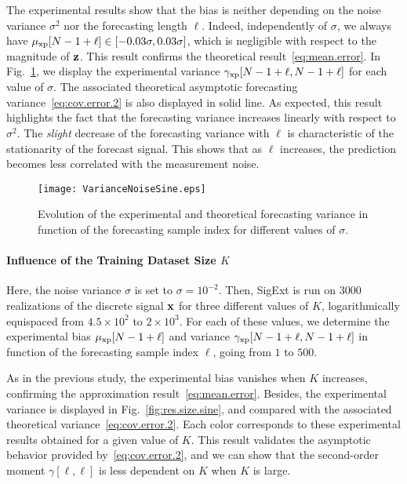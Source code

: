 The experimental results show that the bias is neither depending on the noise variance $\sigma^2$ nor the forecasting length $\ell$. Indeed, independently of $\sigma$, we always have $\mu_{{\mathrm{xp}}}[N-1+\ell]\in\left[-0.03\sigma,0.03\sigma\right]$, which is negligible with respect to the magnitude of ${\mathbf z}$. This result confirms the theoretical result~\eqref{eq:mean.error}. In Fig.~\ref{fig:res.noise.sine}, we display the experimental variance $\gamma_{{\mathrm{xp}}}[N-1+\ell,N-1+\ell]$ for each value of $\sigma$. The associated theoretical asymptotic forecasting variance~\eqref{eq:cov.error.2} is also displayed in solid line. As expected, this result highlights the fact that the forecasting variance increases linearly with respect to $\sigma^2$. The {\em slight} decrease of the forecasting variance with $\ell$ is characteristic of the stationarity of the forecast signal. This shows that as $\ell$ increases, the prediction becomes less correlated with the measurement noise.

\begin{figure}
\centering
\texttt{[image: VarianceNoiseSine.eps]}
\caption{Evolution of the experimental and theoretical forecasting variance in function of the forecasting sample index for different values of $\sigma$.}
\label{fig:res.noise.sine}
\end{figure}

\paragraph{Influence of the Training Dataset Size $K$} Here, the noise variance $\sigma$ is set to $\sigma=10^{-2}$. Then, {\sf SigExt} is run on 3000 realizations of the discrete signal ${\mathbf x}$ for three different values of $K$, logarithmically equispaced from $4.5\times 10^{2}$ to $2\times 10^{3}$. For each of these values, we determine the experimental bias $\mu_{{\mathrm{xp}}}[N-1+\ell]$ and variance $\gamma_{{\mathrm{xp}}}[N-1+\ell,N-1+\ell]$ in function of the forecasting sample index $\ell$, going from $1$ to $500$. 

As in the previous study, the experimental bias vanishes when $K$ increases, confirming the approximation result~\eqref{eq:mean.error}. Besides, the experimental variance  is displayed in Fig.~\ref{fig:res.size.sine}, and compared with the associated theoretical variance~\eqref{eq:cov.error.2}. Each color corresponds to these experimental results obtained for a given value of $K$. This result validates the asymptotic behavior provided by~\eqref{eq:cov.error.2}, and we can show that the second-order moment $\gamma[\ell,\ell]$ is less dependent on $K$ when $K$ is large.


